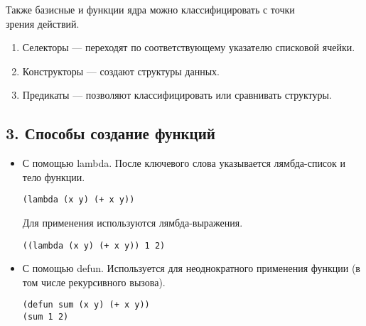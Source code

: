Также базисные и функции ядра можно классифицировать с точки \\зрения действий.
\begin{enumerate}
	\item Селекторы --- переходят по соответствующему указателю списковой ячейки.
	\item Конструкторы --- создают структуры данных.
	\item Предикаты --- позволяют классифицировать или сравнивать структуры.
\end{enumerate}

\subsection*{3. Способы создание функций}

\begin{itemize}
	\item С помощью lambda. После ключевого слова указывается лямбда-список и тело функции. 
	\begin{lstlisting}
(lambda (x y) (+ x y))
	\end{lstlisting}
	Для применения используются лямбда-выражения.
	\begin{lstlisting}
((lambda (x y) (+ x y)) 1 2)
	\end{lstlisting}
	\item С помощью defun. Используется для неоднократного применения функции (в том числе рекурсивного вызова).
	\begin{lstlisting}
(defun sum (x y) (+ x y))
(sum 1 2)
	\end{lstlisting}

\end{itemize}

